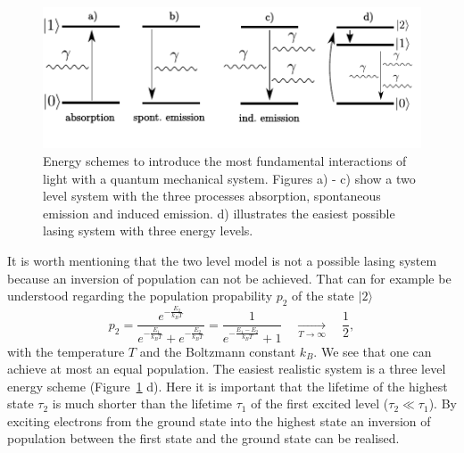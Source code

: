 \begin{figure}
  \centering
  \includegraphics[scale = 0.9]{pics/energyscheme.pdf}
  \caption{Energy schemes to introduce the most fundamental interactions of light with a quantum mechanical system. Figures a) - c) show
  a two level system with the three processes absorption, spontaneous emission and induced emission. d) illustrates the easiest possible lasing
  system with three energy levels.}
  \label{fig: two_level}
\end{figure}

It is worth mentioning that the two level model is not a possible lasing system because an inversion of population
can not be achieved. That can for example be understood
regarding the population propability $p_2$ of the state $|2\rangle$
\begin{equation}
  p_2 = \frac{e^{-\frac{E_2}{k_B T}}}{ e^{-\frac{E_1}{k_B T}} + e^{-\frac{E_2}{k_B T}} } =
  \frac{1}{ e^{-\frac{E_1 - E_2}{k_B T}} + 1}
    \quad \underset{T \rightarrow \infty}{\longrightarrow}\quad  \frac{1}{2},
\end{equation}
with the temperature $T$ and the Boltzmann constant $k_B$. We see that one can achieve at most an equal population. The easiest
realistic system is a three level energy scheme (Figure~\ref{fig: two_level} d). Here it is important that the lifetime of the highest state $\tau_2$ is much shorter
than the lifetime $\tau_1$ of the first excited level ($\tau_2 \ll \tau_1$). By exciting electrons from the ground state into the highest
state an inversion of population between the first state and the ground state can be realised.

